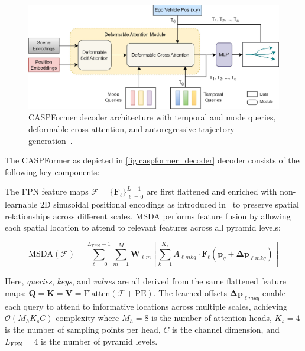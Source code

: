 \begin{description}[leftmargin=1em,itemsep=2pt]
\begin{figure}[ht]
  \centering
  \includegraphics[width=0.85\linewidth]{figures/caspformer_decoder.jpg}
  \caption{CASPFormer decoder architecture with temporal and mode queries, deformable cross-attention, and autoregressive trajectory generation~\cite{caspformerYadav2024}.}
  \label{fig:caspformer_decoder}
\end{figure}

The CASPFormer as depicted in \autoref{fig:caspformer_decoder} decoder consists of the following key components:

\begin{description}[leftmargin=1em,itemsep=2pt]
\item[Multi-Scale Deformable Self-Attention (MSDA).] The FPN feature maps \(\boldsymbol{\mathcal{F}} = \{\mathbf{F}_\ell\}_{\ell=0}^{L-1}\) are first flattened and enriched with non-learnable 2D sinusoidal positional encodings as introduced in~\cite{vaswani2023attention} to preserve spatial relationships across different scales. MSDA performs feature fusion by allowing each spatial location to attend to relevant features across all pyramid levels:

\begin{equation}
\label{eq:msda_operation}
\text{MSDA}(\boldsymbol{\mathcal{F}}) = \sum_{\ell=0}^{L_{\text{FPN}}-1} \sum_{m=1}^{M} \mathbf{W}_{\ell m} \left[ \sum_{k=1}^{K_s} A_{\ell mkq} \cdot \mathbf{F}_\ell(\mathbf{p}_q + \boldsymbol{\Delta p}_{\ell mkq}) \right]
\end{equation}

Here, \emph{queries}, \emph{keys}, and \emph{values} are all derived from the same flattened feature maps: \(\mathbf{Q} = \mathbf{K} = \mathbf{V} = \text{Flatten}(\boldsymbol{\mathcal{F}} + \text{PE})\). The learned offsets \(\boldsymbol{\Delta p}_{\ell mkq}\) enable each query to attend to informative locations across multiple scales, achieving \(\mathcal{O}(M_h K_s C)\) complexity where \(M_h = 8\) is the number of attention heads, \(K_s = 4\) is the number of sampling points per head, \(C\) is the channel dimension, and \(L_{\text{FPN}} = 4\) is the number of pyramid levels.


\end{description}
\end{description}
